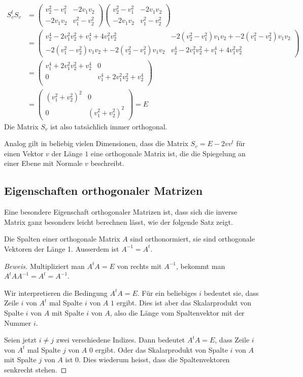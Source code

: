 \begin{align*}
S_v^tS_v
&=
\begin{pmatrix}
v_2^2-v_1^2&-2v_1v_2\\
-2v_1v_2&v_1^2-v_2^2
\end{pmatrix}
\begin{pmatrix}
v_2^2-v_1^2&-2v_1v_2\\
-2v_1v_2&v_1^2-v_2^2
\end{pmatrix}
\\
&=
\begin{pmatrix}
v_2^4-2v_1^2v_2^2+v_1^4+4v_1^2v_2^2&
-2(v_2^2-v_1^2)v_1v_2
+
-2(v_1^2-v_2^2)v_1v_2
\\
-2(v_1^2-v_2^2)v_1v_2
+
-2(v_2^2-v_1^2)v_1v_2
&
v_2^4-2v_1^2v_2^2+v_1^4+4v_1^2v_2^2
\end{pmatrix}
\\
&=
\begin{pmatrix}
v_1^4+2v_1^2v_2^2+v_2^4&0\\
0&v_1^4+2v_1^2v_2^2+v_2^4\\
\end{pmatrix}
\\
&=
\begin{pmatrix}
(v_1^2+v_2^2)^2&0\\
0&(v_1^2+v_2^2)^2
\end{pmatrix}=E
\end{align*}
Die Matrix $S_v$ ist also tatsächlich immer orthogonal.

Analog gilt in beliebig vielen Dimensionen, dass die Matrix
$S_v=E-2v v^t$  für einen Vektor $v$ der Länge $1$ eine orthogonale
Matrix ist, die die Spiegelung an einer Ebene mit Normale $v$
beschreibt.

\subsection{Eigenschaften orthogonaler Matrizen}
Eine besondere Eigenschaft orthogonaler Matrizen ist, dass sich die
inverse Matrix ganz besonders leicht berechnen lässt, wie der folgende
Satz zeigt.
\begin{satz}
Die Spalten einer orthogonale Matrix $A$ sind orthonormiert, sie sind
orthogonale Vektoren der Länge 1.
Ausserdem ist $A^{-1}=A^t$.
\end{satz}

\begin{proof}[Beweis]
Multipliziert man $A^tA=E$ von rechts mit $A^{-1}$, bekommt man
$A^tAA^{-1}=A^t=A^{-1}$.

Wir interpretieren die Bedingung $A^tA=E$.
Für ein beliebiges $i$
bedeutet sie, dass Zeile $i$ von $A^t$ mal Spalte $i$ von $A$ $1$ ergibt.
Dies ist aber das Skalarprodukt von Spalte $i$ von $A$ mit Spalte $i$
von $A$, also die Länge vom Spaltenvektor mit der Nummer $i$.

Seien jetzt $i\ne j$ zwei verschiedene Indizes.
Dann bedeutet $A^tA=E$,
dass Zeile $i$ von $A^t$ mal Spalte $j$ von $A$ $0$ ergibt.
Oder das
Skalarprodukt von Spalte $i$ von $A$ mit Spalte $j$ von $A$ ist $0$.
Dies wiederum heisst, dass die Spaltenvektoren senkrecht stehen.
\end{proof}

